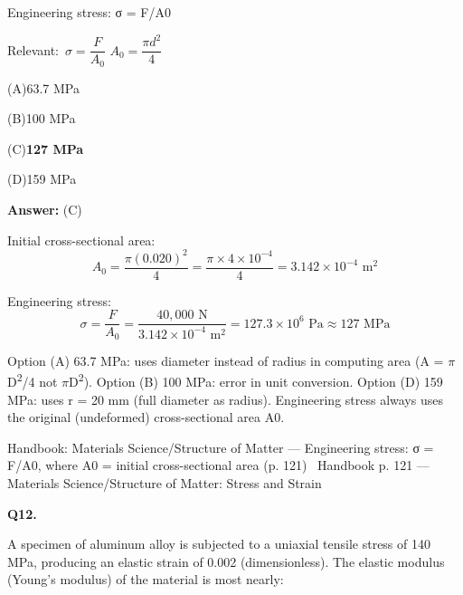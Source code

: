 \documentclass[11pt]{article}
\newcommand{\correct}[1]{\textbf{#1}\;{\color{accent}$\checkmark$}}
\newcommand{\optline}[2]{\par\noindent\hspace{1.2em}(#1)\hspace{0.6em}#2}
\begin{document}
Engineering stress: σ = F/A0\par\vspace{3pt}
{\small\color{soft}Relevant:}\ $\sigma = \dfrac{F}{A_0}$ \quad $A_0 = \dfrac{\pi d^2}{4}$\par\vspace{3pt}
\optline{A}{63.7 MPa}
\optline{B}{100 MPa}
\optline{C}{\correct{127 MPa}}
\optline{D}{159 MPa}
\par\vspace{3pt}
\vspace{2pt}\par\noindent\colorbox{boxbg}{\parbox{\dimexpr\linewidth-2\fboxsep\relax}{%
\vspace{2pt}\textbf{Answer:} (C)\par\vspace{2pt}
{\small Initial cross-sectional area:
\[A_0 = \frac{\pi (0.020)^2}{4} = \frac{\pi \times 4 \times 10^{-4}}{4} = 3.142 \times 10^{-4}\text{ m}^2\]

Engineering stress:
\[\sigma = \frac{F}{A_0} = \frac{40{,}000\text{ N}}{3.142 \times 10^{-4}\text{ m}^2} = 127.3 \times 10^6\text{ Pa} \approx 127\text{ MPa}\]

Option (A) 63.7 MPa: uses diameter instead of radius in computing area (A = $\pi$D\textsuperscript{2}/4 not $\pi$D\textsuperscript{2}). Option (B) 100 MPa: error in unit conversion. Option (D) 159 MPa: uses r = 20 mm (full diameter as radius). Engineering stress always uses the original (undeformed) cross-sectional area A0.}\par\vspace{2pt}
{\footnotesize\color{soft}Handbook: Materials Science/Structure of Matter --- Engineering stress: σ = F/A0, where A0 = initial cross-sectional area (p. 121) \textbullet\ Handbook p. 121 --- Materials Science/Structure of Matter: Stress and Strain}\vspace{2pt}
}}
\vspace{9pt}
\filbreak
\textbf{\color{accent}Q12.}\par\vspace{2pt}
A specimen of aluminum alloy is subjected to a uniaxial tensile stress of 140 MPa, producing an elastic strain of 0.002 (dimensionless). The elastic modulus (Young's modulus) of the material is most nearly:
\end{document}
